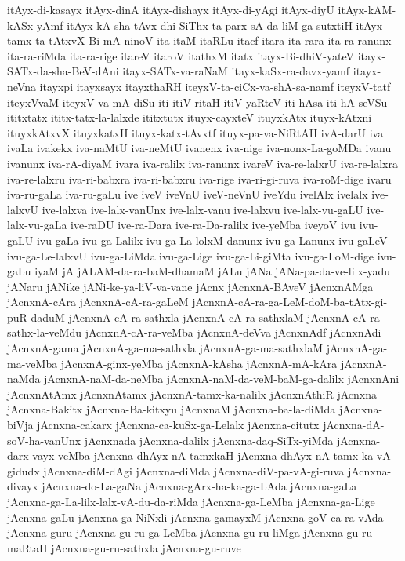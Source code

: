 {itAyx-di-kasayx
itAyx-dinA
itAyx-dishayx
itAyx-di-yAgi
itAyx-diyU
itAyx-kAM-kASx-yAmf
itAyx-kA-sha-tAvx-dhi-SiThx-ta-parx-sA-da-liM-ga-sutxtiH
itAyx-tamx-ta-tAtxvX-Bi-mA-ninoV
ita
itaM
itaRLu
itacf
itara
ita-rara
ita-ra-ranunx
ita-ra-riMda
ita-ra-rige
itareV
itaroV
itathxM
itatx
itayx-Bi-dhiV-yateV
itayx-SATx-da-sha-BeV-dAni
itayx-SATx-va-raNaM
itayx-kaSx-ra-davx-yamf
itayx-neVna
itayxpi
itayxsayx
itayxthaRH
iteyxV-ta-ciCx-va-shA-sa-namf
iteyxV-tatf
iteyxVvaM
iteyxV-va-mA-diSu
iti
itiV-ritaH
itiV-yaRteV
iti-hAsa
iti-hA-seVSu
ititxtatx
ititx-tatx-la-lalxde
ititxtutx
ituyx-cayxteV
ituyxkAtx
ituyx-kAtxni
ituyxkAtxvX
ituyxkatxH
ituyx-katx-tAvxtf
ituyx-pa-va-NiRtAH
ivA-darU
iva
ivaLa
ivakekx
iva-naMtU
iva-neMtU
ivanenx
iva-nige
iva-nonx-La-goMDa
ivanu
ivanunx
iva-rA-diyaM
ivara
iva-ralilx
iva-ranunx
ivareV
iva-re-lalxrU
iva-re-lalxra
iva-re-lalxru
iva-ri-babxra
iva-ri-babxru
iva-rige
iva-ri-gi-ruva
iva-roM-dige
ivaru
iva-ru-gaLa
iva-ru-gaLu
ive
iveV
iveVnU
iveV-neVnU
iveYdu
ivelAlx
ivelalx
ive-lalxvU
ive-lalxva
ive-lalx-vanUnx
ive-lalx-vanu
ive-lalxvu
ive-lalx-vu-gaLU
ive-lalx-vu-gaLa
ive-raDU
ive-ra-Dara
ive-ra-Da-ralilx
ive-yeMba
iveyoV
ivu
ivu-gaLU
ivu-gaLa
ivu-ga-Lalilx
ivu-ga-La-lolxM-danunx
ivu-ga-Lanunx
ivu-gaLeV
ivu-ga-Le-lalxvU
ivu-ga-LiMda
ivu-ga-Lige
ivu-ga-Li-giMta
ivu-ga-LoM-dige
ivu-gaLu
iyaM
jA
jALAM-da-ra-baM-dhamaM
jALu
jANa
jANa-pa-da-ve-lilx-yadu
jANaru
jANike
jANi-ke-ya-liV-va-vane
jAcnx
jAcnxnA-BAveV
jAcnxnAMga
jAcnxnA-cAra
jAcnxnA-cA-ra-gaLeM
jAcnxnA-cA-ra-ga-LeM-doM-ba-tAtx-gi-puR-daduM
jAcnxnA-cA-ra-sathxla
jAcnxnA-cA-ra-sathxlaM
jAcnxnA-cA-ra-sathx-la-veMdu
jAcnxnA-cA-ra-veMba
jAcnxnA-deVva
jAcnxnAdf
jAcnxnAdi
jAcnxnA-gama
jAcnxnA-ga-ma-sathxla
jAcnxnA-ga-ma-sathxlaM
jAcnxnA-ga-ma-veMba
jAcnxnA-ginx-yeMba
jAcnxnA-kAsha
jAcnxnA-mA-kAra
jAcnxnA-naMda
jAcnxnA-naM-da-neMba
jAcnxnA-naM-da-veM-baM-ga-dalilx
jAcnxnAni
jAcnxnAtAmx
jAcnxnAtamx
jAcnxnA-tamx-ka-nalilx
jAcnxnAthiR
jAcnxna
jAcnxna-Bakitx
jAcnxna-Ba-kitxyu
jAcnxnaM
jAcnxna-ba-la-diMda
jAcnxna-biVja
jAcnxna-cakarx
jAcnxna-ca-kuSx-ga-Lelalx
jAcnxna-citutx
jAcnxna-dA-soV-ha-vanUnx
jAcnxnada
jAcnxna-dalilx
jAcnxna-daq-SiTx-yiMda
jAcnxna-darx-vayx-veMba
jAcnxna-dhAyx-nA-tamxkaH
jAcnxna-dhAyx-nA-tamx-ka-vA-gidudx
jAcnxna-diM-dAgi
jAcnxna-diMda
jAcnxna-diV-pa-vA-gi-ruva
jAcnxna-divayx
jAcnxna-do-La-gaNa
jAcnxna-gArx-ha-ka-ga-LAda
jAcnxna-gaLa
jAcnxna-ga-La-lilx-lalx-vA-du-da-riMda
jAcnxna-ga-LeMba
jAcnxna-ga-Lige
jAcnxna-gaLu
jAcnxna-ga-NiNxli
jAcnxna-gamayxM
jAcnxna-goV-ca-ra-vAda
jAcnxna-guru
jAcnxna-gu-ru-ga-LeMba
jAcnxna-gu-ru-liMga
jAcnxna-gu-ru-maRtaH
jAcnxna-gu-ru-sathxla
jAcnxna-gu-ruve
}
